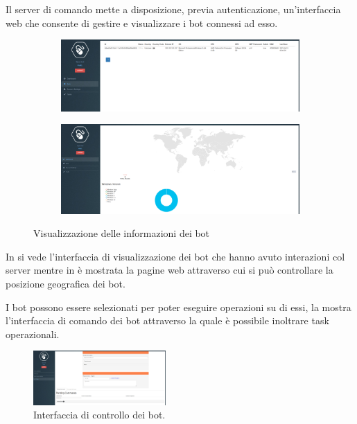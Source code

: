 Il server di comando mette a disposizione, previa autenticazione, un'interfaccia web che consente di gestire e visualizzare i bot connessi ad esso.
\begin{figure}[hbtp]
    \centering
    \begin{subfigure}{0.45\textwidth}
        \centering
        \includegraphics[width=\textwidth,height=0.45\textwidth]{res/fig/uboat-home.png}
        \caption{}
        \label{fig:uboat-home-1}
    \end{subfigure}
    \begin{subfigure}{0.45\textwidth}
        \centering
        \includegraphics[width=\textwidth,height=0.45\textwidth]{res/fig/uboat-map.png}
        \caption{}
        \label{fig:uboat-home-2}
    \end{subfigure}
    \caption{Visualizzazione delle informazioni dei  bot}
    \label{fig:uboat-home}
\end{figure}

In  si vede l'interfaccia di visualizzazione dei bot che hanno avuto interazioni col server mentre in  è mostrata la pagine web attraverso cui si può controllare la posizione geografica dei bot.

I bot possono essere selezionati per poter eseguire operazioni su di essi, la  mostra l'interfaccia di comando dei bot attraverso la quale è possibile inoltrare task operazionali.
\begin{figure}[hbtp]
    \centering
    \includegraphics[width=0.45\textwidth]{res/fig/uboat-control.png}
    \caption{Interfaccia di controllo dei bot.}
    \label{fig:uboat-control}
\end{figure}


